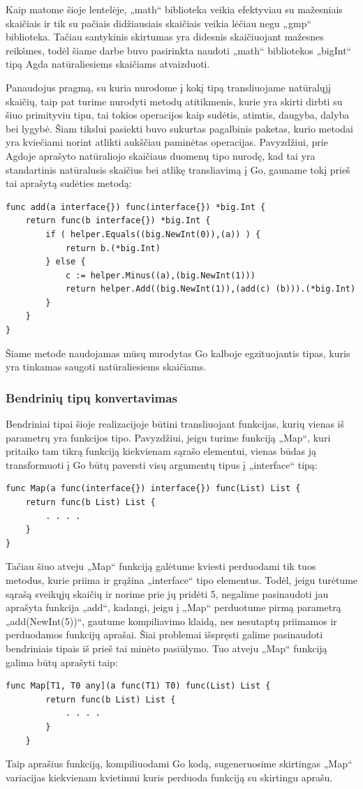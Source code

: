 \documentclass{VUMIFPSkursinis}
\begin{document}
	Kaip matome šioje lentelėje, „math“ biblioteka veikia efektyviau su mažesniais skaičiais ir tik su pačiais didžiausiais skaičiais veikia lėčiau negu „gmp“ biblioteka. Tačiau santykinis skirtumas yra didesnis skaičiuojant mažesnes reikšmes, todėl šiame darbe buvo pasirinkta naudoti „math“ bibliotekos „bigInt“ tipą Agda natūraliesiems skaičiams atvaizduoti.
\par Panaudojus pragmą, su kuria nurodome į kokį tipą transliuojame natūralųjį skaičių, taip pat turime nurodyti metodų atitikmenis, kurie yra skirti dirbti su šiuo primityviu tipu, tai tokios operacijos kaip sudėtis, atimtis, daugyba, dalyba bei lygybė. Šiam tikslui pasiekti buvo sukurtas pagalbinis paketas, kurio metodai yra kviečiami norint atlikti aukščiau paminėtas operacijas. Pavyzdžiui, prie Agdoje aprašyto natūraliojo skaičiaus duomenų tipo nurodę, kad tai yra standartinis natūralusis skaičius bei atlikę transliavimą į Go, gauname tokį prieš tai aprašytą sudėties metodą:
\begin{lstlisting}[language=GoCust]
func add(a interface{}) func(interface{}) *big.Int {
	return func(b interface{}) *big.Int {
 		if ( helper.Equals((big.NewInt(0)),(a)) ) {
 			return b.(*big.Int) 
		} else {
 			c := helper.Minus((a),(big.NewInt(1))) 
 			return helper.Add((big.NewInt(1)),(add(c) (b))).(*big.Int) 
		}
 	}
}
\end{lstlisting}
Šiame metode naudojamas mūsų nurodytas Go kalboje egzituojantis tipas, kuris yra tinkamas saugoti natūraliesiems skaičiams.
\subsubsection{Bendrinių tipų konvertavimas}
Bendriniai tipai šioje realizacijoje būtini transliuojant funkcijas, kurių vienas iš parametrų yra funkcijos tipo. Pavyzdžiui, jeigu turime funkciją „Map“, kuri pritaiko tam tikrą funkciją kiekvienam sąrašo elementui, vienas būdas ją transformuoti į Go būtų paversti visų argumentų tipus į „interface{}“ tipą:
\begin{lstlisting}[language=GoCust]
func Map(a func(interface{}) interface{}) func(List) List {
	return func(b List) List {
		. . . .
	}
}
\end{lstlisting}
Tačiau šiuo atveju „Map“ funkciją galėtume kviesti perduodami tik tuos metodus, kurie priima ir grąžina „interface{}“ tipo elementus. Todėl, jeigu turėtume sąrašą sveikųjų skaičių ir norime prie jų pridėti 5, negalime pasinaudoti jau aprašyta funkcija „add“, kadangi, jeigu į „Map“ perduotume pirmą parametrą „add(NewInt(5))“, gautume kompiliavimo klaidą, nes nesutaptų priimamos ir perduodamos funkcijų aprašai. Šiai problemai išspręsti galime pasinaudoti bendriniais tipais iš prieš tai minėto pasiūlymo. Tuo atveju „Map“ funkciją galima būtų aprašyti taip:
\begin{lstlisting}[language=GoCust]
	func Map[T1, T0 any](a func(T1) T0) func(List) List {
		return func(b List) List {
			. . . .
		}
	}
	\end{lstlisting}
Taip aprašius funkciją, kompiliuodami Go kodą, sugeneruosime skirtingas „Map“ variacijas kiekvienam kvietimui kuris perduoda funkciją su skirtingu aprašu.
\end{document}
